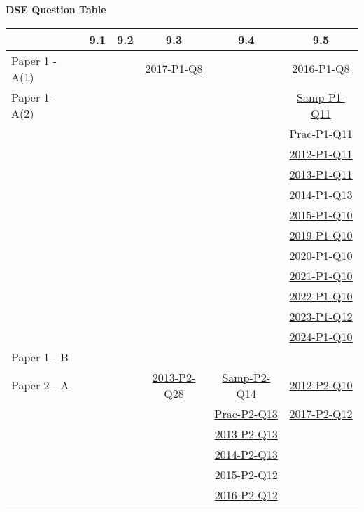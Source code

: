 \documentclass[12pt, a4paper]{article}
\begin{document}
\begin{absolutelynopagebreak}
\begin{center}
\textbf{DSE Question Table}
\end{center}
\begin{center}
\begin{tabular}{|l|c|c|c|c|c|}
\hline
        & 9.1 & 9.2 & 9.3 & 9.4 & 9.5 \\\hline
\hline
Paper 1 - A(1)&  &  & \hyperref[DSE2017-CoreP1-Q08]{2017-P1-Q8} &  & \hyperref[DSE2016-CoreP1-Q08]{2016-P1-Q8} \\
\hline
Paper 1 - A(2)&  &  &  &  & \hyperref[DSE2012S-CoreP1-Q11]{Samp-P1-Q11} \\
&  &  &  &  & \hyperref[DSE2012P-CoreP1-Q11]{Prac-P1-Q11} \\
&  &  &  &  & \hyperref[DSE2012-CoreP1-Q11]{2012-P1-Q11} \\
&  &  &  &  & \hyperref[DSE2013-CoreP1-Q11]{2013-P1-Q11} \\
&  &  &  &  & \hyperref[DSE2014-CoreP1-Q13]{2014-P1-Q13} \\
&  &  &  &  & \hyperref[DSE2015-CoreP1-Q10]{2015-P1-Q10} \\
&  &  &  &  & \hyperref[DSE2019-CoreP1-Q10]{2019-P1-Q10} \\
&  &  &  &  & \hyperref[DSE2020-CoreP1-Q10]{2020-P1-Q10} \\
&  &  &  &  & \hyperref[DSE2021-CoreP1-Q10]{2021-P1-Q10} \\
&  &  &  &  & \hyperref[DSE2022-CoreP1-Q10]{2022-P1-Q10} \\
&  &  &  &  & \hyperref[DSE2023-CoreP1-Q12]{2023-P1-Q12} \\
&  &  &  &  & \hyperref[DSE2024-CoreP1-Q10]{2024-P1-Q10} \\
\hline
Paper 1 - B&  &  &  &  &  \\
\hline
\hline
Paper 2 - A&  &  & \hyperref[DSE2013-CoreP2-Q28]{2013-P2-Q28} & \hyperref[DSE2012S-CoreP2-Q14]{Samp-P2-Q14} & \hyperref[DSE2012-CoreP2-Q10]{2012-P2-Q10} \\
&  &  &  & \hyperref[DSE2012P-CoreP2-Q13]{Prac-P2-Q13} & \hyperref[DSE2017-CoreP2-Q12]{2017-P2-Q12} \\
&  &  &  & \hyperref[DSE2013-CoreP2-Q13]{2013-P2-Q13} &  \\
&  &  &  & \hyperref[DSE2014-CoreP2-Q13]{2014-P2-Q13} &  \\
&  &  &  & \hyperref[DSE2015-CoreP2-Q12]{2015-P2-Q12} &  \\
&  &  &  & \hyperref[DSE2016-CoreP2-Q12]{2016-P2-Q12} &  \\

\end{tabular}
\end{center}
\end{absolutelynopagebreak}
\end{document}
